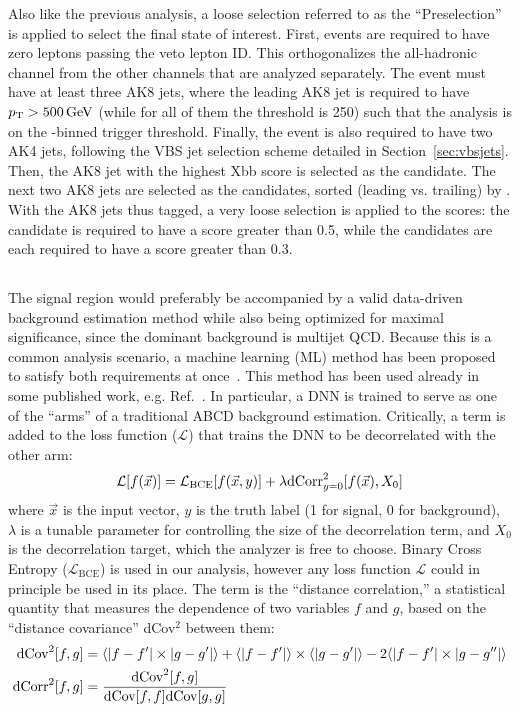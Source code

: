 Also like the previous analysis, a loose selection referred to as the ``Preselection'' is applied to select the final state of interest. 
First, events are required to have zero leptons passing the veto lepton ID. 
This orthogonalizes the all-hadronic channel from the other channels that are analyzed separately. 
The event must have at least three AK8 jets, where the leading AK8 jet is required to have $p_{\mathrm{T}} > 500\,\text{Ge\hspace{-.08em}V}$ (while for all of them the \pt threshold is 250\GeV) such that the analysis is on the \HT-binned trigger threshold. 
Finally, the event is also required to have two AK4 jets, following the VBS jet selection scheme detailed in Section~\ref{sec:vbsjets}.
Then, the AK8 jet with the highest \ParticleNet Xbb score is selected as the \Htobb candidate. 
The next two AK8 jets are selected as the \Vtoqq candidates, sorted (leading vs. trailing) by \pt.
With the AK8 jets thus tagged, a very loose selection is applied to the \ParticleNet scores: the \Htobb candidate is required to have a \ParticleNet \Xtobb score greater than 0.5, while the \Vtoqq candidates are each required to have a \ParticleNet \XWtoqq score greater than 0.3.

\subsection{\ABCDNet}
The signal region would preferably be accompanied by a valid data-driven background estimation method while also being optimized for maximal significance, since the dominant background is multijet QCD.
Because this is a common analysis scenario, a machine learning (ML) method has been proposed to satisfy both requirements at once~\cite{AutoABCD}. 
This method has been used already in some published work, e.g. Ref.~\cite{CMS:2022cpe}. 
In particular, a DNN is trained to serve as one of the ``arms'' of a traditional ABCD background estimation. 
Critically, a \dCorrSq term is added to the loss function ($\mathcal{L}$) that trains the DNN to be decorrelated with the other arm:
\begin{equation}
    \mathcal{L}[f(\vec{x})] = \mathcal{L}_\mathrm{BCE}[f(\vec{x}, y)] + \lambda\text{dCorr}^2_{y=0}[f(\vec{x}), X_0]
\end{equation}
where $\vec{x}$ is the input vector, $y$ is the truth label (1 for signal, 0 for background), $\lambda$ is a tunable parameter for controlling the size of the decorrelation term, and $X_0$ is the decorrelation target, which the analyzer is free to choose.
Binary Cross Entropy ($\mathcal{L}_\mathrm{BCE}$) is used in our analysis, however any loss function $\mathcal{L}$ could in principle be used in its place.
The \dCorrSq term is the ``distance correlation,'' a statistical quantity that measures the dependence of two variables $f$ and $g$, based on the ``distance covariance'' dCov$^2$ between them:
\begin{align}
    \text{dCov}^2[f,g] &= \langle|f-f'|\times|g-g'|\rangle + \langle|f-f'|\rangle\times\langle|g-g'|\rangle - 2\langle|f - f'|\times|g-g''|\rangle \\
    \text{dCorr}^2[f,g] &= \frac{\text{dCov}^2[f, g]}{\text{dCov}[f, f]\text{dCov}[g, g]} \label{dCorrEq}
\end{align}

